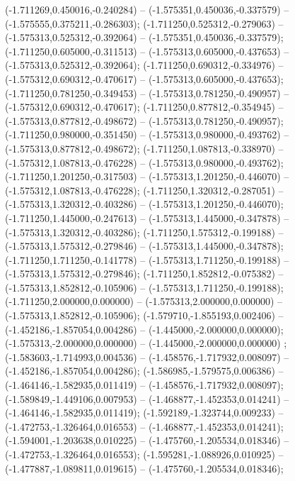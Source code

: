  (-1.711269,0.450016,-0.240284) -- (-1.575351,0.450036,-0.337579) -- (-1.575555,0.375211,-0.286303);
 (-1.711250,0.525312,-0.279063) -- (-1.575313,0.525312,-0.392064) -- (-1.575351,0.450036,-0.337579);
 (-1.711250,0.605000,-0.311513) -- (-1.575313,0.605000,-0.437653) -- (-1.575313,0.525312,-0.392064);
 (-1.711250,0.690312,-0.334976) -- (-1.575312,0.690312,-0.470617) -- (-1.575313,0.605000,-0.437653);
 (-1.711250,0.781250,-0.349453) -- (-1.575313,0.781250,-0.490957) -- (-1.575312,0.690312,-0.470617);
 (-1.711250,0.877812,-0.354945) -- (-1.575313,0.877812,-0.498672) -- (-1.575313,0.781250,-0.490957);
 (-1.711250,0.980000,-0.351450) -- (-1.575313,0.980000,-0.493762) -- (-1.575313,0.877812,-0.498672);
 (-1.711250,1.087813,-0.338970) -- (-1.575312,1.087813,-0.476228) -- (-1.575313,0.980000,-0.493762);
 (-1.711250,1.201250,-0.317503) -- (-1.575313,1.201250,-0.446070) -- (-1.575312,1.087813,-0.476228);
 (-1.711250,1.320312,-0.287051) -- (-1.575313,1.320312,-0.403286) -- (-1.575313,1.201250,-0.446070);
 (-1.711250,1.445000,-0.247613) -- (-1.575313,1.445000,-0.347878) -- (-1.575313,1.320312,-0.403286);
 (-1.711250,1.575312,-0.199188) -- (-1.575313,1.575312,-0.279846) -- (-1.575313,1.445000,-0.347878);
 (-1.711250,1.711250,-0.141778) -- (-1.575313,1.711250,-0.199188) -- (-1.575313,1.575312,-0.279846);
 (-1.711250,1.852812,-0.075382) -- (-1.575313,1.852812,-0.105906) -- (-1.575313,1.711250,-0.199188);
 (-1.711250,2.000000,0.000000) -- (-1.575313,2.000000,0.000000) -- (-1.575313,1.852812,-0.105906);
 (-1.579710,-1.855193,0.002406) -- (-1.452186,-1.857054,0.004286) -- (-1.445000,-2.000000,0.000000);
 (-1.575313,-2.000000,0.000000) -- (-1.445000,-2.000000,0.000000) ;
 (-1.583603,-1.714993,0.004536) -- (-1.458576,-1.717932,0.008097) -- (-1.452186,-1.857054,0.004286);
 (-1.586985,-1.579575,0.006386) -- (-1.464146,-1.582935,0.011419) -- (-1.458576,-1.717932,0.008097);
 (-1.589849,-1.449106,0.007953) -- (-1.468877,-1.452353,0.014241) -- (-1.464146,-1.582935,0.011419);
 (-1.592189,-1.323744,0.009233) -- (-1.472753,-1.326464,0.016553) -- (-1.468877,-1.452353,0.014241);
 (-1.594001,-1.203638,0.010225) -- (-1.475760,-1.205534,0.018346) -- (-1.472753,-1.326464,0.016553);
 (-1.595281,-1.088926,0.010925) -- (-1.477887,-1.089811,0.019615) -- (-1.475760,-1.205534,0.018346);
